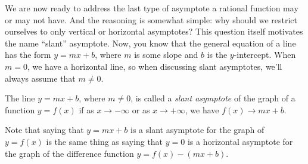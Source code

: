 \documentclass{ximera}
\begin{document}
We are now ready to address the last type of asymptote a rational function may or may not have. And the reasoning is somewhat simple: why should we restrict ourselves to only vertical or horizontal asymptotes? This question itself motivates the name ``slant'' asymptote. Now, you know that the general equation of a line has the form $y=mx+b$, where $m$ is some slope and $b$ is the $y$-intercept. When $m=0$, we have a horizontal line, so when discussing slant asymptotes, we'll always assume that $m \neq 0$.

\begin{definition}
  The line $y=mx+b$, where $m\neq 0$, is called a \emph{slant asymptote} of the graph of a function $y=f(x)$ if as $x \to -\infty$ or as $x\to +\infty$, we have $f(x) \to mx+b$.
\end{definition}

Note that saying that $y=mx+b$ is a slant asymptote for the graph of $y=f(x)$ is the same thing as saying that $y=0$ is a horizontal asymptote for the graph of the difference function $y=f(x)-(mx+b)$.
\end{document}
